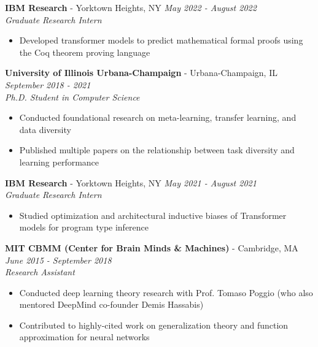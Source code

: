 \documentclass{article}
\newenvironment{changemargin}[2]{%
  \begin{list}{}{%
    \setlength{\topsep}{0pt}%
    \setlength{\leftmargin}{#1}%
    \setlength{\rightmargin}{#2}%
    \setlength{\listparindent}{\parindent}%
    \setlength{\itemindent}{\parindent}%
    \setlength{\parsep}{\parskip}%
  }%
  \item[]}{\end{list}
}
\newenvironment{body} {
	\vspace*{-16pt}
	\begin{changemargin}{-0.25in}{-0.5in}
  }	
	{\end{changemargin}
}
\begin{document}
\begin{body}
	\textbf{IBM Research} - Yorktown Heights, NY \hfill \emph{May 2022 - August 2022}\\
	\emph{Graduate Research Intern}\\
	\vspace*{-3pt}
	\begin{itemize} \itemsep -2pt
		\item Developed transformer models to predict mathematical formal proofs using the Coq theorem proving language
	\end{itemize}
	\vspace{5 pt}

	\textbf{University of Illinois Urbana-Champaign} - Urbana-Champaign, IL \hfill \emph{September 2018 - 2021}\\
	\emph{Ph.D. Student in Computer Science}\\
	\vspace*{-3pt}
	\begin{itemize} \itemsep -2pt
		\item Conducted foundational research on meta-learning, transfer learning, and data diversity
		\item Published multiple papers on the relationship between task diversity and learning performance
	\end{itemize}
	\vspace{5 pt}
	
	\textbf{IBM Research} - Yorktown Heights, NY \hfill \emph{May 2021 - August 2021}\\
	\emph{Graduate Research Intern}\\
	\vspace*{-3pt}
	\begin{itemize} \itemsep -2pt
		\item Studied optimization and architectural inductive biases of Transformer models for program type inference
	\end{itemize}
	\vspace{5 pt}

	\textbf{MIT CBMM (Center for Brain Minds \& Machines)} - Cambridge, MA \hfill \emph{June 2015 - September 2018}\\
	\emph{Research Assistant}\\
	\vspace*{-3pt}
	\begin{itemize} \itemsep -2pt
        \item Conducted deep learning theory research with Prof. Tomaso Poggio (who also mentored DeepMind co-founder Demis Hassabis)
        \item Contributed to highly-cited work on generalization theory and function approximation for neural networks
	\end{itemize}
    
\end{body}
\end{document}

